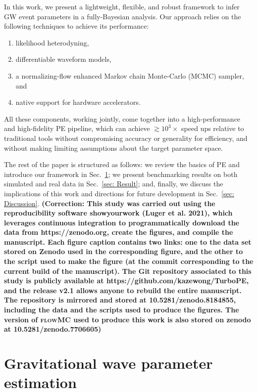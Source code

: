 \documentclass[twocolumn]{aastex631}
\newcommand{\corr}[1]{\textbf{\color{pyRed}(Correction: #1)}}
\begin{document}

In this work, we present a lightweight, flexible, and robust
framework to infer GW event parameters in a fully-Bayesian analysis. Our
approach relies on the following techniques to achieve its performance:
\begin{enumerate}
\setlength{\itemsep}{0pt}
\item likelihood heterodyning,
\item differentiable waveform models,
\item a normalizing-flow enhanced Markov chain Monte-Carlo (MCMC) sampler, and
\item native support for hardware accelerators.
\end{enumerate}
All these components, working jointly, come together into a high-performance
and high-fidelity PE pipeline, which can achieve ${\gtrsim}10^3\times$ speed
ups relative to traditional tools without compromising accuracy or generality
for efficiency, and without making limiting assumptions about the target
parameter space.

The rest of the paper is structured as follows: we review the basics of PE and
introduce our framework in Sec.~\ref{sec: PE}; we present benchmarking results
on both simulated and real data in Sec.~\ref{sec: Result}; and, finally, we
discuss the implications of this work and directions for future development in
Sec.~\ref{sec: Discussion}. \corr{This study was carried out using the
reproducibility software showyourwork (Luger et al. 2021), which leverages
continuous integration to programmatically download the data from
https://zenodo.org, create the figures, and compile the manuscript. Each figure
caption contains two links: one to the data set stored on Zenodo used in the
corresponding figure, and the other to the script used to make the figure (at
the commit corresponding to the current build of the manuscript). The Git
repository associated to this study is publicly available at
https://github.com/kazewong/TurboPE, and the release v2.1 allows anyone to
rebuild the entire manuscript. The repository is mirrored and stored at
10.5281/zenodo.8184855, including the data and the scripts used to produce the
figures. The version of \textsc{flowMC} used to produce this work is also stored
on zenodo at 10.5281/zenodo.7706605}

\section{Gravitational wave parameter estimation}
\label{sec: PE}
\end{document}

